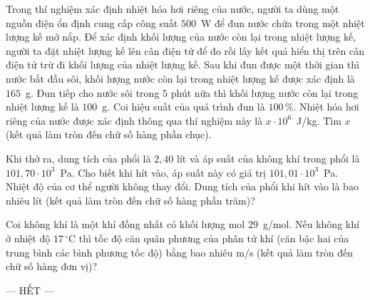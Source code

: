 	\begin{ex}%
		Trong thí nghiệm xác định nhiệt hóa hơi riêng của nước, người ta dùng một nguồn điện ổn định cung cấp công suất $500$~W để đun nước chứa trong một nhiệt lượng kế mở nắp. Để xác định khối lượng của nước còn lại trong nhiệt lượng kế, người ta đặt nhiệt lượng kế lên cân điện tử để đo rồi lấy kết quả hiển thị trên cân điện tử trừ đi khối lượng của nhiệt lượng kế. Sau khi đun được một thời gian thì nước bắt đầu sôi, khối lượng nước còn lại trong nhiệt lượng kế được xác định là $165$~g. Đun tiếp cho nước sôi trong $5$ phút nữa thì khối lượng nước còn lại trong nhiệt lượng kế là $100$~g. Coi hiệu suất của quá trình đun là $100\,\%$. Nhiệt hóa hơi riêng của nước được xác định thông qua thí nghiệm này là $x\cdot 10^6$~J/kg. Tìm $x$ (kết quả làm tròn đến chữ số hàng phần chục).
		\par
	\end{ex}

	\begin{ex}%
		Khi thở ra, dung tích của phổi là $2{,}40$ lít và áp suất của không khí trong phổi là $101{,}70\cdot 10^3$~Pa. Cho biết khi hít vào, áp suất này có giá trị $101{,}01\cdot 10^3$~Pa. Nhiệt độ của cơ thể người không thay đổi. Dung tích của phổi khi hít vào là bao nhiêu lít (kết quả làm tròn đến chữ số hàng phần trăm)?
		\par
	\end{ex}

	\begin{ex}%
		Coi không khí là một khí đồng nhất có khối lượng mol $29$~g/mol. Nếu không khí ở nhiệt độ $17\,^\circ\text{C}$ thì tốc độ căn quân phương của phân tử khí (căn bậc hai của trung bình các bình phương tốc độ) bằng bao nhiêu m/s (kết quả làm tròn đến chữ số hàng đơn vị)?
		\par
	\end{ex}

	\centerline{--- HẾT ---}


